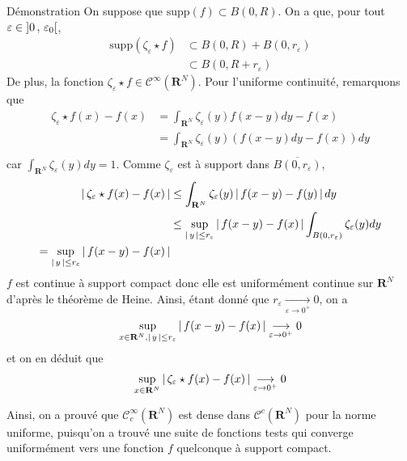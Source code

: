         \begin{demo}{Démonstration}
            On suppose que $\text{supp}(f) \subset B(0,R)$. On a que, pour tout $\varepsilon \in \left] 0 \, , \, \varepsilon_0 \right[$, 
            \begin{align*}
                \text{supp}(\zeta_{\varepsilon} \star f) 
                &\subset B(0,R) + B(0,r_{\varepsilon}) \\
                &\subset B(0,R + r_{\varepsilon})
            \end{align*}
            De plus, la fonction $\zeta_{\varepsilon} \star f \in \mathcal{C}^{\infty}(\mathbf{R}^N)$. Pour l’uniforme continuité, remarquons que 
            \begin{align*}
                \zeta_{\varepsilon} \star f(x) - f(x)
                &= \int_{\mathbf{R}^N} \zeta_{\varepsilon}(y)f(x-y)dy - f(x) \\
                &= \int_{\mathbf{R}^N} \zeta_{\varepsilon}(y)(f(x-y)dy - f(x)) dy \\
            \end{align*}
            car $\int_{\mathbf{R}^N} \zeta_{\varepsilon}(y)dy = 1$. Comme $\zeta_{\varepsilon}$ est à support dans $\overline{B(0,r_{\varepsilon})}$, 
            \begin{align*}
                \left\lvert \, \zeta_{\varepsilon} \star f(x) - f(x) \, \right\rvert 
                &\leq \int_{\mathbf{R}^N} \zeta_{\varepsilon}(y)\left\lvert \, f(x-y) - f(y) \, \right\rvert dy \\
                &\leq \sup_{\left\lvert \, y \, \right\rvert \leq r_{\varepsilon}} \left\lvert \, f(x-y) - f(x) \, \right\rvert \int_{B(0,r_{\varepsilon})} \zeta_{\varepsilon}(y)dy \\
                = \sup_{\left\lvert \, y \, \right\rvert \leq r_{\varepsilon}} \left\lvert \, f(x-y) - f(x) \, \right\rvert
            \end{align*}
            $f$ est continue à support compact donc elle est uniformément continue sur $\mathbf{R}^N$ d’après le théorème de Heine. Ainsi, étant donné que $r_{\varepsilon} \underset{\varepsilon \to 0^+}{\longrightarrow} 0$, 
            on a 
            \[ \sup_{x \in \mathbf{R}^N, \left\lvert \, y \, \right\rvert \leq r_{\varepsilon}} \left\lvert \, f(x-y) - f(x) \, \right\rvert \underset{\varepsilon \to 0^{+}}{\longrightarrow} 0 \]   
            et on en déduit que 
            \[ \sup_{x \in \mathbf{R}^N} \left\lvert \, \zeta_{\varepsilon} \star f(x)-f(x) \, \right\rvert \underset{\varepsilon \to 0^+}{\longrightarrow} 0 \]
        \end{demo}

        Ainsi, on a prouvé que $\mathcal{C}_c^{\infty}(\mathbf{R}^N)$ est dense dans $\mathcal{C}^c(\mathbf{R}^N)$ pour la norme uniforme, puisqu’on a trouvé une suite de fonctions tests qui converge uniformément vers une fonction $f$ quelconque à support compact.

